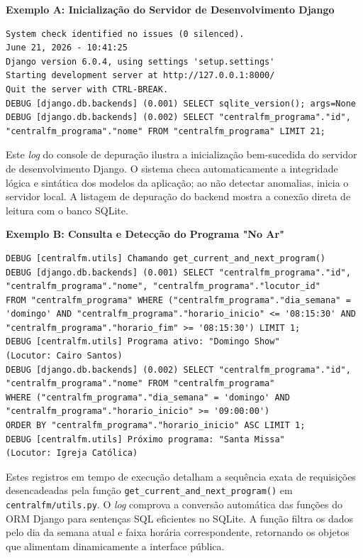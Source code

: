 \documentclass[12pt, openright, oneside, a4paper, brazil]{ads-unipac-abntex2}
\begin{document}
\begin{apendicesenv}
\textbf{Exemplo A: Inicialização do Servidor de Desenvolvimento Django}
\begin{verbatim}
System check identified no issues (0 silenced).
June 21, 2026 - 10:41:25
Django version 6.0.4, using settings 'setup.settings'
Starting development server at http://127.0.0.1:8000/
Quit the server with CTRL-BREAK.
DEBUG [django.db.backends] (0.001) SELECT sqlite_version(); args=None
DEBUG [django.db.backends] (0.002) SELECT "centralfm_programa"."id", 
"centralfm_programa"."nome" FROM "centralfm_programa" LIMIT 21;
\end{verbatim}

Este \textit{log} do console de depuração ilustra a inicialização bem-sucedida do servidor de desenvolvimento Django. O sistema checa automaticamente a integridade lógica e sintática dos modelos da aplicação; ao não detectar anomalias, inicia o servidor local. A listagem de depuração do backend mostra a conexão direta de leitura com o banco SQLite.

\vspace{0.5cm}

\textbf{Exemplo B: Consulta e Detecção do Programa "No Ar"}
\begin{verbatim}
DEBUG [centralfm.utils] Chamando get_current_and_next_program()
DEBUG [django.db.backends] (0.001) SELECT "centralfm_programa"."id", 
"centralfm_programa"."nome", "centralfm_programa"."locutor_id" 
FROM "centralfm_programa" WHERE ("centralfm_programa"."dia_semana" = 
'domingo' AND "centralfm_programa"."horario_inicio" <= '08:15:30' AND 
"centralfm_programa"."horario_fim" >= '08:15:30') LIMIT 1;
DEBUG [centralfm.utils] Programa ativo: "Domingo Show" 
(Locutor: Cairo Santos)
DEBUG [django.db.backends] (0.002) SELECT "centralfm_programa"."id", 
"centralfm_programa"."nome" FROM "centralfm_programa" 
WHERE ("centralfm_programa"."dia_semana" = 'domingo' AND 
"centralfm_programa"."horario_inicio" >= '09:00:00') 
ORDER BY "centralfm_programa"."horario_inicio" ASC LIMIT 1;
DEBUG [centralfm.utils] Próximo programa: "Santa Missa" 
(Locutor: Igreja Católica)
\end{verbatim}

Estes registros em tempo de execução detalham a sequência exata de requisições desencadeadas pela função \texttt{get\_current\_and\_next\_program()} em \texttt{centralfm/utils.py}. O \textit{log} comprova a conversão automática das funções do ORM Django para sentenças SQL eficientes no SQLite. A função filtra os dados pelo dia da semana atual e faixa horária correspondente, retornando os objetos que alimentam dinamicamente a interface pública.


\end{apendicesenv}
\end{document}
